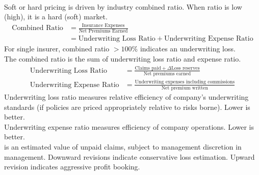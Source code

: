 \begin{remark} \\
Soft or hard pricing is driven by industry combined ratio. When ratio is low (high), it is a hard (soft) market.
\begin{align}
\text{Combined Ratio} &= \frac{\text{Insurance Expenses}}{\text{Net Premiums Earned}}\nonumber \\
&= \text{Underwriting Loss Ratio} + \text{Underwriting Expense Ratio} \nonumber
\end{align}
For single insurer, combined ratio $> 100\%$ indicates an underwriting loss.\\
The combined ratio is the sum of underwriting loss ratio and expense ratio.
\begin{align}
\text{Underwriting Loss Ratio} &= \frac{\text{Claims paid} + \Delta \text{Loss reserves}}{\text{Net premiums earned}} \nonumber \\
\text{Underwriting Expense Ratio} &= \frac{\text{Underwriting expenses including commissions}}{\text{Net premium written}} \nonumber
\end{align}
Underwriting loss ratio measures relative efficiency of company's underwriting standards (if policies are priced appropriately relative to risks borne). Lower is better.\\
Underwriting expense ratio measures efficiency of company operations. Lower is better.\\
 is an estimated value of unpaid claims, subject to management discretion in management. Downward revisions indicate conservative loss estimation. Upward revision indicates aggressive profit booking.
\end{remark}

